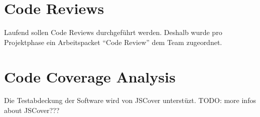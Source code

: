 \section{Code Reviews}
Laufend sollen Code Reviews durchgeführt werden. Deshalb wurde pro Projektphase ein Arbeitspacket ``Code Review'' dem Team zugeordnet.


\section{Code Coverage Analysis}
Die Testabdeckung der Software wird von JSCover  unterstüzt.
\newline TODO: more infos about JSCover???

